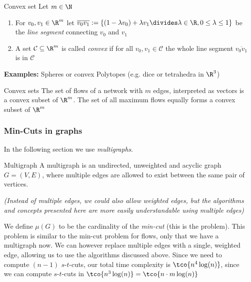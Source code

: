 \begin{definition}[]{Convex set}
    Let $m \in \N$
    \begin{enumerate}[label=(\roman*)]
        \item For $v_0, v_1 \in \R^m$ let $\overline{v_0v_1}:=\{(1 - \lambda v_0) + \lambda v_1 \divides \lambda \in \R, 0 \leq \lambda \leq 1\}$ be the \textit{line segment} connecting $v_0$ and $v_1$
        \item A set $\mathcal{C} \subseteq \R^m$ is called \textit{convex} if for all $v_0, v_1 \in \mathcal{C}$ the whole line segment $\overline{v_0 v_1}$ is in $\mathcal{C}$
    \end{enumerate}
\end{definition}
\textbf{Examples:} Spheres or convex Polytopes (e.g. dice or tetrahedra in $\R^3$)
\begin{theorem}[]{Convex sets}
    The set of flows of a network with $m$ edges, interpreted as vectors is a convex subset of $\R^m$. The set of all maximum flows equally forms a convex subset of $\R^m$
\end{theorem}


\newpage
\subsubsection{Min-Cuts in graphs}
In the following section we use \textit{multigraphs}.
\begin{recall}[]{Multigraph}
    A multigraph is an undirected, unweighted and acyclic graph $G = (V, E)$, where multiple edges are allowed to exist between the same pair of vertices.

    \textit{(Instead of multiple edges, we could also allow weighted edges, but the algorithms and concepts presented here are more easily understandable using multiple edges)}
\end{recall}


We define $\mu(G)$ to be the cardinality of the \textit{min-cut} (this is the problem).
This problem is similar to the min-cut problem for flows, only that we have a multigraph now. We can however replace multiple edges with a single, weighted edge, allowing us to use the algorithms discussed above.
Since we need to compute $(n - 1)$ $s$-$t$-cuts, our total time complexity is $\tco{n^4 \log(n)}$, since we can compute $s$-$t$-cuts in $\tco{n^3\log(n)} = \tco{n\cdot m\log(n)}$




